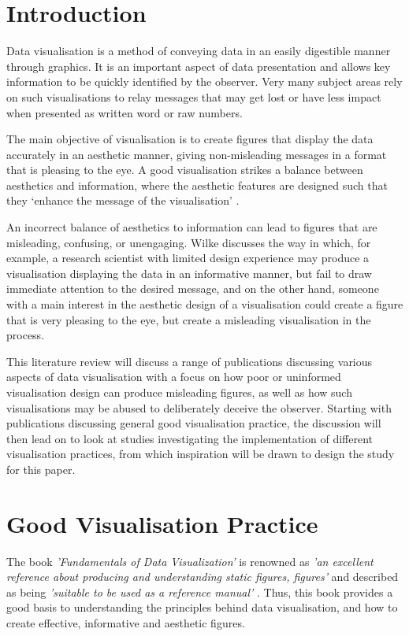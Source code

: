 \documentclass[
  12pt,
]{book}
\author{}
\date{\vspace{-2.5em}}
\begin{document}
\frontmatter

\mainmatter
\section{Introduction}

Data visualisation is a method of conveying data in an easily digestible
manner through graphics. It is an important aspect of data presentation
and allows key information to be quickly identified by the observer.
Very many subject areas rely on such visualisations to relay messages
that may get lost or have less impact when presented as written word or
raw numbers.

The main objective of visualisation is to create figures that display
the data accurately in an aesthetic manner, giving non-misleading
messages in a format that is pleasing to the eye. A good visualisation
strikes a balance between aesthetics and information, where the
aesthetic features are designed such that they `enhance the message of
the visualisation' \citep{wilke2019}.

An incorrect balance of aesthetics to information can lead to figures
that are misleading, confusing, or unengaging. Wilke discusses the way
in which, for example, a research scientist with limited design
experience may produce a visualisation displaying the data in an
informative manner, but fail to draw immediate attention to the desired
message, and on the other hand, someone with a main interest in the
aesthetic design of a visualisation could create a figure that is very
pleasing to the eye, but create a misleading visualisation in the
process.

This literature review will discuss a range of publications discussing
various aspects of data visualisation with a focus on how poor or
uninformed visualisation design can produce misleading figures, as well
as how such visualisations may be abused to deliberately deceive the
observer. Starting with publications discussing general good
visualisation practice, the discussion will then lead on to look at
studies investigating the implementation of different visualisation
practices, from which inspiration will be drawn to design the study for
this paper.

\section{Good Visualisation Practice}

The book \textit{'Fundamentals of Data Visualization'} \citep{wilke2019}
is renowned as
\textit{'an excellent reference about producing and understanding static figures, figures'}
\citep[see][]{wilkerev} and described as being
\textit{'suitable to be used as a reference manual'}
\citep[see][]{hwang2020}. Thus, this book provides a good basis to
understanding the principles behind data visualisation, and how to
create effective, informative and aesthetic figures.
\end{document}
